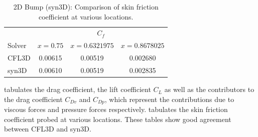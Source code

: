 \begin{table}[ht!]
\centering
\caption{2D Bump (syn3D): Comparison of skin friction coefficient at various locations.}
\label{tab:syn2dbump2}
\begin{tabular}{lccc}
\toprule
& \multicolumn{3}{c}{$C_f$} \\
\cline{2-4}
Solver & $x=0.75$ & $x=0.6321975$ & $x=0.8678025$ \\
\midrule
CFL3D & 0.00615 & 0.00519  & 0.002680   \\
syn3D & 0.00610 & 0.00519  & 0.002835  \\
\bottomrule
\end{tabular}

\end{table}

 tabulates the drag coefficient, the lift coefficient $C_L$ as well as the contributors to the drag coefficient $C_{Dv}$ and $C_{Dp}$, which represent the contributions due to viscous forces and pressure forces respectively.  tabulates the skin friction coefficient probed at various locations. These tables show good agreement between CFL3D and syn3D.


